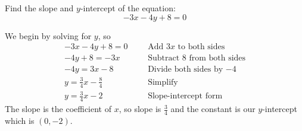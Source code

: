 \begin{exa}
Find the slope and $y$-intercept of the equation: \[-3x-4y+8=0\]
\end{exa}
We begin by solving for $y$, so
\begin{align*}
		-3x-4y+8=0& && \text{Add $3x$ to both sides}\\
		-4y +8 =-3x&    &&\text{Subtract 8 from both sides}\\
        -4y = 3x-8& &&\text{Divide both sides by $-4$}\\
        y = \frac{3}{4}x-\frac{8}{4}&	&&\textrm{Simplify}\\
        y = \frac{3}{4}x -2&	&&\textrm{Slope-intercept form}
\end{align*}
The slope is the coefficient of $x$, so slope is $\frac{3}{4}$ and the constant is our $y$-intercept which is $(0,-2)$.
